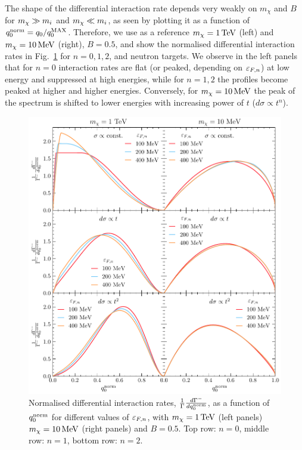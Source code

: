 The shape of the differential interaction rate depends very weakly on $m_\chi$ and $B$ for $m_\chi\gg m_i$ and $m_\chi \ll m_i$, as seen by plotting it as a function of $q_0^{\rm norm}=q_0/q_0^{\rm MAX}$. Therefore, we use as a reference $m_\chi=1{\rm \,TeV}$ (left) and $m_\chi=10{\rm \,MeV}$ (right),  $B=0.5$, and show the normalised differential interaction rates in Fig.~\ref{fig:diffgamma} for $n=0,1,2$, and neutron targets.
We observe in the left panels that for $n=0$ interaction rates are flat (or peaked, depending on $\varepsilon_{F,n}$) at low energy and suppressed at high energies, while for $n=1,2$ the profiles become peaked at higher and higher energies. Conversely, for $m_\chi=10{\rm \,MeV}$ the peak of the spectrum is shifted to lower energies with increasing power of $t$ ($d\sigma\propto t^n$).

\begin{figure}
    \centering
    \includegraphics{img/chapter_3/capture_1/norm_diff_intrate_n.pdf}
    \caption{Normalised differential interaction rates, $\frac{1}{\Gamma}\frac{d\Gamma^-}{dq_0^{\rm norm}}$, as a function of $q_0^{\rm norm}$ for different values of $\varepsilon_{F,n}$, with $m_\chi=1{\rm \,TeV}$ (left panels) $m_\chi=10{\rm \,MeV}$ (right panels) and $B=0.5$. Top row: $n=0$, middle row: $n=1$, bottom row: $n=2$.}
    \label{fig:diffgamma}
\end{figure}

